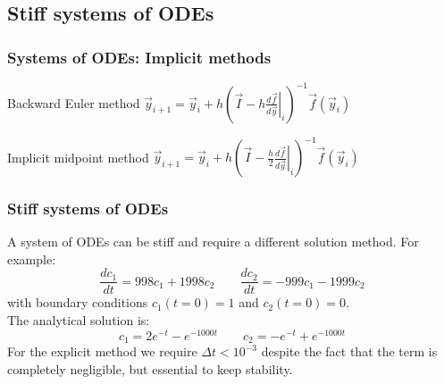 \subsection{Stiff systems of ODEs}
\begin{frame}
  \frametitle{Systems of ODEs: Implicit methods}
  \begin{block}{Backward Euler method}
    $ \displaystyle  \vec{y}_{i+1} = \vec{y}_i + h \left(\vec{I} - h\left. \frac{d\vec{f}}{d\vec{y}}\right|_i \right)^{-1}\vec{f}(\vec{y}_i)$
  \end{block}
  \begin{block}{Implicit midpoint method}
    $ \displaystyle  \vec{y}_{i+1} = \vec{y}_i + h \left(\vec{I} - \frac{h}{2}\left. \frac{d\vec{f}}{d\vec{y}}\right|_i \right)^{-1} \vec{f}(\vec{y}_i)$
  \end{block}  
\end{frame}

\begin{frame}
  \frametitle{Stiff systems of ODEs}
  A system of ODEs can be stiff and require a different solution method. \pause
  For example:
  \[
    \frac{dc_1}{dt} = 998c_1 + 1998c_2 \qquad 
    \frac{dc_2}{dt} = -999c_1 -1999c_2
  \]
  with boundary conditions $c_1(t=0)=1$ and $c_2(t=0)=0$. \\
  The analytical solution is: 
  \[
    c_1 = 2e^{-t}-e^{-1000t} \qquad
    c_2 =-e^{-t}+e^{-1000t}
  \]
  For the explicit method we require $\Delta t<10^{-3}$ despite the fact that the term is completely negligible, but essential to keep stability. \pause
\end{frame}



